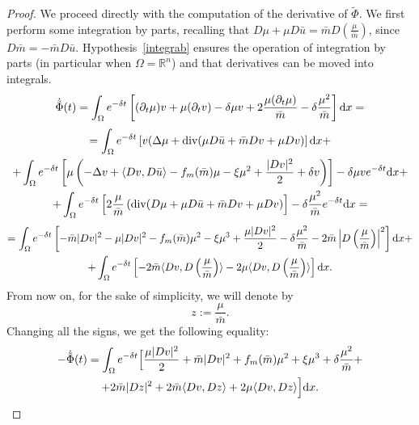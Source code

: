 \documentclass[10pt,a4paper,nouppercase,nowrite]{article}
\numberwithin{equation}{section}
\newcommand{\di}{{\rm d}}
\newcommand{\R}{\mathbb{R}}
\theoremstyle{definition}
\begin{document}
	\begin{proof}
		We proceed directly with the computation of the derivative of $\tilde{\Phi}$. We first perform some integration by parts, recalling that $D\mu + \mu D\bar{u}= \bar{m}D\left( \frac{\mu}{\bar{m}} \right)$, since $D \bar m = - \bar m D \bar u$. Hypothesis~\eqref{integrab} ensures the operation of integration by parts (in particular when $\Omega = \R^n$) and that derivatives can be moved into integrals.
		\begin{equation*}
			\dot{\tilde{\Phi}}(t)=\int_{\Omega} e^{-\delta t} \left[ (\partial_t \mu) v + \mu (\partial_t v) - \delta \mu v + 2\frac{\mu (\partial_t \mu)}{\bar{m}} - \delta \frac{\mu^2}{\bar{m}} \right] \di x=
		\end{equation*}
		\begin{multline*}
			=\int_{\Omega} e^{-\delta t} \left[ v(\Delta \mu + \text{div}(\mu D\bar{u} + \bar{m}Dv + \mu Dv ) \right] \di x + \\
			+\int_{\Omega} e^{-\delta t} \left[ \mu \left( -\Delta v + \langle Dv,D\bar{u} \rangle - f_m(\bar{m})\mu - \xi \mu^2 + \frac{|Dv|^2}{2} + \delta v \right) \right] - \delta \mu v e^{-\delta t} \di x +  \\
			+ \int_{\Omega} e^{-\delta t} \left[ 2\frac{\mu}{\bar{m}} \left( \text{div}(D\mu + \mu D\bar{u} + \bar{m} Dv + \mu Dv \right) \right] - \delta \frac{\mu^2}{\bar{m}} e^{-\delta t} \di x=
		\end{multline*}
		\begin{multline*}
			=\int_{\Omega} e^{-\delta t} \left[ - \bar{m} |Dv|^2 - \mu |Dv|^2 - f_m(\bar{m})\mu^2 - \xi \mu^3 + \frac{\mu|Dv|^2}{2} - \delta \frac{\mu^2}{\bar{m}} - 2\bar{m} \left| D\left(\frac{\mu}{\bar{m}} \right) \right|^2 \right] \di x +\\
			+\int_{\Omega} e^{-\delta t} \left[- 2 \bar{m} \langle Dv,D\left( \frac{\mu}{\bar{m}} \right) \rangle - 2 \mu \langle Dv,D\left( \frac{\mu}{\bar{m}} \right) \rangle \right] \di x.
		\end{multline*}
		From now on, for the sake of simplicity, we will denote by
		$$z:=\frac{\mu}{\bar{m}}.$$
		Changing all the signs, we get the following equality:
		\begin{multline}
			-\dot{\tilde{\Phi}}(t) = \int_{\Omega} e^{-\delta t} \Big[ \frac{\mu |Dv|^2}{2} + \bar{m}|Dv|^2 +  f_m(\bar{m})\mu^2 + \xi \mu^3 + \delta \frac{\mu^2}{\bar{m}} +\\ + 2\bar{m}|Dz|^2 + 2\bar{m} \langle Dv,Dz \rangle + 2\mu \langle Dv,Dz \rangle \Big] \di x.
			\label{part1}
		\end{multline}

\end{proof}
\end{document}
